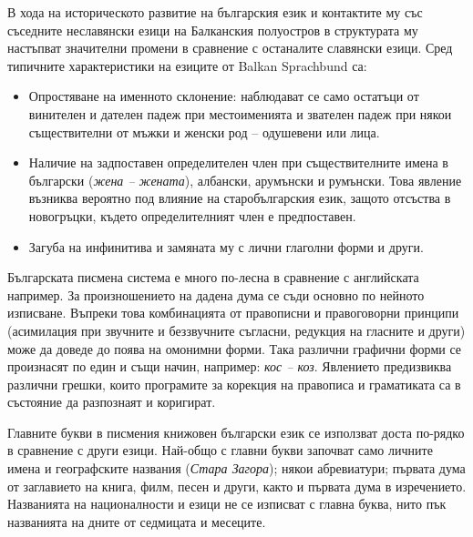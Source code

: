 \begin{multicols}{2}
  В хода на историческото развитие на българския език и
   контактите му със съседните неславянски езици на Балканския полуостров в структурата му настъпват значителни промени в сравнение с останалите славянски
   езици. Сред типичните характеристики на езиците от
   Balkan Sprachbund са:

  \begin{itemize}
  \item Опростяване на именното склонение: наблюдават се
   само остатъци от винителен и дателен падеж при
   местоименията и звателен падеж при някои съществителни от мъжки и женски род – одушевени
   или лица.

  \item Наличие на задпоставен определителен член при съществителните имена в български ({\it жена – жената}),
   албански, арумънски и румънски. Това явление възниква вероятно под влияние на старобългарския език,
   защото отсъства в новогръцки, където определителният член е предпоставен.

  \item Загуба на инфинитива и замяната му с лични
  глаголни форми и други. 
  \end{itemize}


  Българската писмена система е много по-лесна в сравнение с
   английската например.
   За произношението на дадена дума се съди основно по нейното изписване. Въпреки това комбинацията от правописни и
   правоговорни принципи (асимилация при звучните и
   беззвучните съгласни, редукция на гласните и други)
   може да доведе до поява на омонимни форми. Така различни графични форми се произнасят
   по един и същи начин, например:
  \textit{кос -- коз}. Явлението предизвиква различни
   грешки, които програмите за корекция на правописа и
  граматиката са в състояние да разпознаят и коригират.

  Главните букви в писмения книжовен български език се използват доста по-рядко в сравнение с други езици. Най-общо с главни букви започват само личните имена и географските названия
   ({\it Стара Загора}); някои абревиатури; първата дума от
   заглавието на книга, филм, песен и други, както и първата дума в 
  изречението. Названията на
   националности и езици не се изписват с главна буква,
   нито пък названията на дните от
   седмицата и месеците.



\end{multicols}
